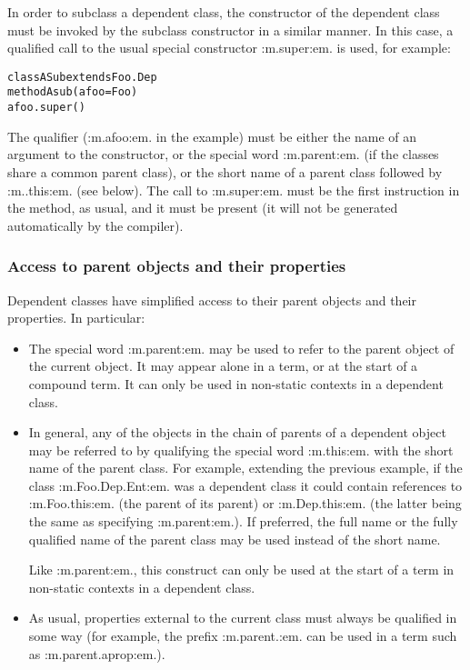 In order to subclass a dependent class, the constructor of the dependent
class must be invoked by the subclass constructor in a similar manner.
In this case, a qualified call to the usual special
constructor :m.super:em. is used, for example:
\begin{alltt}
class ASub extends Foo.Dep
  method Asub(afoo=Foo)
    afoo.super()
\end{alltt}
 The qualifier (:m.afoo:em. in the example) must be either the name of
an argument to the constructor, or the special word :m.parent:em. (if
the classes share a common parent class), or the short name of a parent
class followed by :m..this:em. (see below).
The call to :m.super:em. must be the first instruction in the method, as
usual, and it must be present (it will not be generated automatically by
the compiler).
\subsubsection{Access to parent objects and their properties}
 
Dependent classes have simplified access to their parent objects and
their properties.
In particular:
\begin{itemize}
\item The special word :m.parent:em. may be used to refer to the
parent object of the current object.  It may appear alone in a term, or
at the start of a compound term.
It can only be used in non-static contexts in a dependent class.
\item 
{}
In general, any of the objects in the chain of parents of a dependent
object may be referred to by qualifying the special word :m.this:em.
with the short name of the parent class.
For example, extending the previous example, if the
class :m.Foo.Dep.Ent:em. was a dependent class it could contain
references to :m.Foo.this:em. (the parent of its parent)
or :m.Dep.this:em. (the latter being the same as
specifying :m.parent:em.).  If preferred, the full name or the fully
qualified name of the parent class may be used instead of the short
name.
 
Like :m.parent:em., this construct can only be used at the start of a
term in non-static contexts in a dependent class.
\item 
{}
As usual, properties external to the current class must always be
qualified in some way (for example, the prefix :m.parent.:em. can be
used in a term such as :m.parent.aprop:em.).
\end{itemize}
